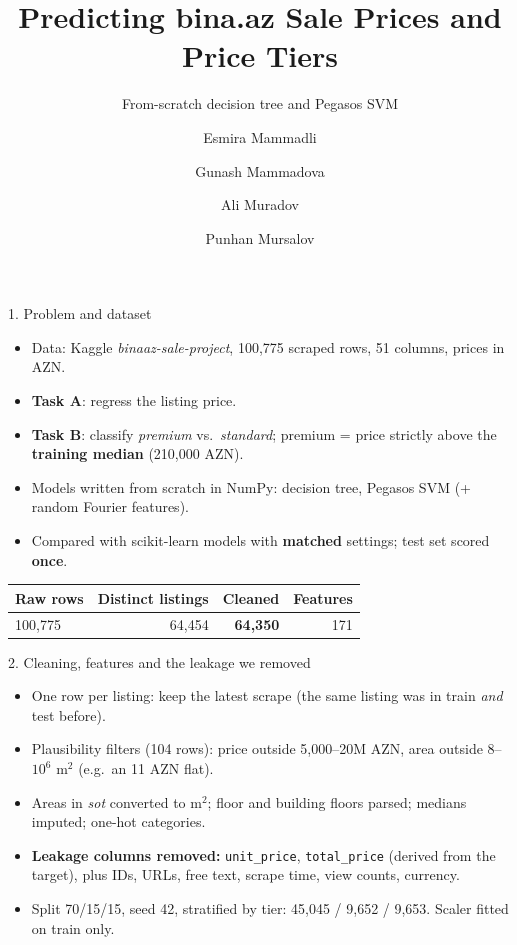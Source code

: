 \documentclass[aspectratio=169,11pt]{beamer}
\title{Predicting bina.az Sale Prices and Price Tiers}
\subtitle{From-scratch decision tree and Pegasos SVM}
\author{Esmira Mammadli \and Gunash Mammadova \and Ali Muradov \and Punhan Mursalov}
\institute{MLE-AI-201 Machine Learning, AI Academy --- Cohort II}
\date{}
\begin{document}
\begin{frame}
  \titlepage
\end{frame}

\begin{frame}{1. Problem and dataset}
  \begin{itemize}
    \item Data: Kaggle \emph{binaaz-sale-project}, 100,775 scraped rows, 51 columns, prices in AZN.
    \item \textbf{Task A}: regress the listing price.
    \item \textbf{Task B}: classify \emph{premium} vs.\ \emph{standard}; premium = price strictly above the \textbf{training median} (210,000 AZN).
    \item Models written from scratch in NumPy: decision tree, Pegasos SVM (+ random Fourier features).
    \item Compared with scikit-learn models with \textbf{matched} settings; test set scored \textbf{once}.
  \end{itemize}
  \vspace{0.5em}
  \centering
  \begin{tabular}{lrrr}
    \toprule
    Raw rows & Distinct listings & Cleaned & Features \\
    \midrule
    100,775 & 64,454 & \textbf{64,350} & 171 \\
    \bottomrule
  \end{tabular}
\end{frame}

\begin{frame}{2. Cleaning, features and the leakage we removed}
  \begin{itemize}
    \item One row per listing: keep the latest scrape (the same listing was in train \emph{and} test before).
    \item Plausibility filters (104 rows): price outside 5,000--20M AZN, area outside 8--$10^6$ m$^2$ (e.g.\ an 11 AZN flat).
    \item Areas in \emph{sot} converted to m$^2$; floor and building floors parsed; medians imputed; one-hot categories.
    \item \textbf{Leakage columns removed:} \texttt{unit\_price}, \texttt{total\_price} (derived from the target), plus IDs, URLs, free text, scrape time, view counts, currency.
    \item Split 70/15/15, seed 42, stratified by tier: 45,045 / 9,652 / 9,653. Scaler fitted on train only.
  \end{itemize}
\end{frame}
\end{document}
